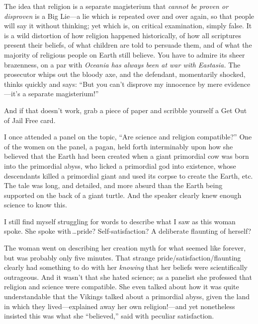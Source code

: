 {
 The idea that religion is a separate magisterium that
\textit{cannot be proven or disproven} is a Big Lie---a lie which is
repeated over and over again, so that people will say it without
thinking; yet which is, on critical examination, simply false. It is a
wild distortion of how religion happened historically, of how all
scriptures present their beliefs, of what children are told to persuade
them, and of what the majority of religious people on Earth still
believe. You have to admire its sheer brazenness, on a par with
\textit{Oceania has always been at war with Eastasia.} The prosecutor
whips out the bloody axe, and the defendant, momentarily shocked,
thinks quickly and says: ``But you
can't disprove my innocence by mere
evidence---it's a separate
magisterium!''}

{
 And if that doesn't work, grab a piece of paper
and scribble yourself a Get Out of Jail Free card.}

\myendsectiontext


{
 I once attended a panel on the topic, ``Are
science and religion compatible?'' One of the women
on the panel, a pagan, held forth interminably upon how she believed
that the Earth had been created when a giant primordial cow was born
into the primordial abyss, who licked a primordial god into existence,
whose descendants killed a primordial giant and used its corpse to
create the Earth, etc. The tale was long, and detailed, and more absurd
than the Earth being supported on the back of a giant turtle. And the
speaker clearly knew enough science to know this. }

{
 I still find myself struggling for words to describe what I saw as
this woman spoke. She spoke with\,\ldots pride? Self-satisfaction? A
deliberate flaunting of herself?}

{
 The woman went on describing her creation myth for what seemed
like forever, but was probably only five minutes. That strange
pride/satisfaction/flaunting clearly had something to do with her
\textit{knowing} that her beliefs were scientifically outrageous. And
it wasn't that she hated science; as a panelist she
professed that religion and science were compatible. She even talked
about how it was quite understandable that the Vikings talked about a
primordial abyss, given the land in which they lived---explained away
her own religion!---and yet nonetheless insisted this was what she
``believed,'' said with peculiar
satisfaction.}

